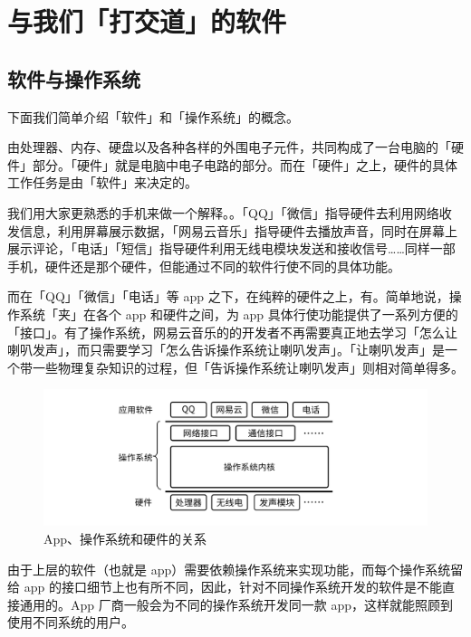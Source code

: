 \section{与我们「打交道」的软件}

\subsection{软件与操作系统}

下面我们简单介绍「软件」和「操作系统」的概念。

由处理器、内存、硬盘以及各种各样的外围电子元件，共同构成了一台电脑的「硬件」部分。「硬件」就是电脑中电子电路的部分。而在「硬件」之上，硬件的具体工作任务是由「软件」来决定的。

我们用大家更熟悉的手机来做一个解释。。「QQ」「微信」指导硬件去利用网络收发信息，利用屏幕展示数据，「网易云音乐」指导硬件去播放声音，同时在屏幕上展示评论，「电话」「短信」指导硬件利用无线电模块发送和接收信号……同样一部手机，硬件还是那个硬件，但能通过不同的软件行使不同的具体功能。

而在「QQ」「微信」「电话」等 app 之下，在纯粹的硬件之上，有。简单地说，操作系统「夹」在各个 app 和硬件之间，为 app 具体行使功能提供了一系列方便的「接口」。有了操作系统，网易云音乐的的开发者不再需要真正地去学习「怎么让喇叭发声」，而只需要学习「怎么告诉操作系统让喇叭发声」。「让喇叭发声」是一个带一些物理复杂知识的过程，但「告诉操作系统让喇叭发声」则相对简单得多。

\begin{figure}[H]
  \centering
  \includegraphics[width=13cm]{assets/Computer_Structure.png}
  \caption{App、操作系统和硬件的关系}
  \label{computer-structure}
\end{figure}

由于上层的软件（也就是 app）需要依赖操作系统来实现功能，而每个操作系统留给 app 的接口细节上也有所不同，因此，针对不同操作系统开发的软件是不能直接通用的。App 厂商一般会为不同的操作系统开发同一款 app，这样就能照顾到使用不同系统的用户。

